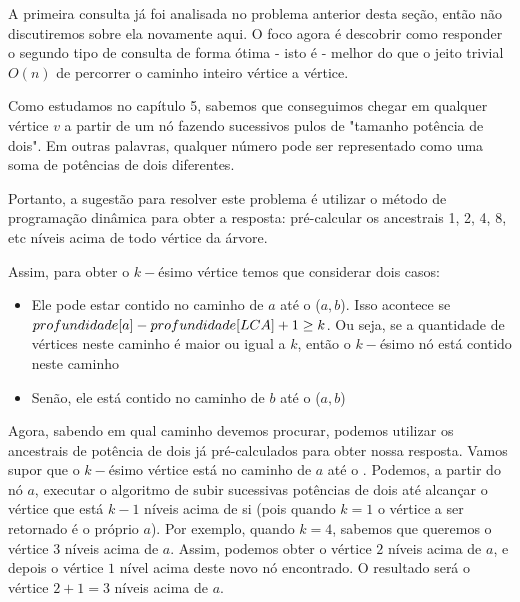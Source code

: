 A primeira consulta já foi analisada no problema anterior desta seção, então não discutiremos sobre ela novamente aqui. O foco agora é descobrir como responder o segundo tipo de consulta de forma ótima - isto é - melhor do que o jeito trivial $O(n)$ de percorrer o caminho inteiro vértice a vértice.

Como estudamos no capítulo 5, sabemos que conseguimos chegar em qualquer vértice $v$ a partir de um nó fazendo sucessivos pulos de "tamanho potência de dois". Em outras palavras, qualquer número pode ser representado como uma soma de potências de dois diferentes.

Portanto, a sugestão para resolver este problema é utilizar o método de programação dinâmica para obter a resposta: pré-calcular os ancestrais 1, 2, 4, 8, etc níveis acima de todo vértice da árvore.

Assim, para obter o $k-$ésimo vértice temos que considerar dois casos:

\begin{itemize}
    \item Ele pode estar contido no caminho de $a$ até o \LCA($a, b$). Isso acontece se $profundidade[a] - profundidade[LCA] + 1 \geq k$. Ou seja, se a quantidade de vértices neste caminho é maior ou igual a $k$, então o $k-$ésimo nó está contido neste caminho
    \item Senão, ele está contido no caminho de $b$ até o \LCA($a, b$)
\end{itemize}

Agora, sabendo em qual caminho devemos procurar, podemos utilizar os ancestrais de potência de dois já pré-calculados para obter nossa resposta. Vamos supor que o $k-$ésimo vértice está no caminho de $a$ até o \LCA. Podemos, a partir do nó $a$, executar o algoritmo de subir sucessivas potências de dois até alcançar o vértice que está $k-1$ níveis acima de si (pois quando $k = 1$ o vértice a ser retornado é o próprio $a$). Por exemplo, quando $k = 4$, sabemos que queremos o vértice $3$ níveis acima de $a$. Assim, podemos obter o vértice $2$ níveis acima de $a$, e depois o vértice $1$ nível acima deste novo nó encontrado. O resultado será o vértice $2 + 1 = 3$ níveis acima de $a$.

